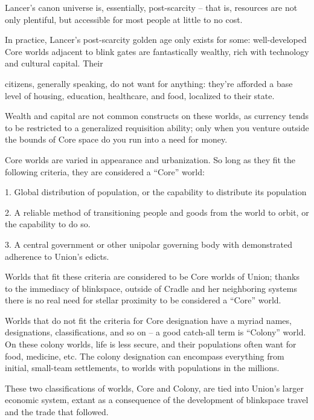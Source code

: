 Lancer’s canon universe is, essentially, post-scarcity -- that is, resources are not only plentiful,  
but accessible for most people at little to no cost. 
 

In practice, Lancer’s post-scarcity golden age only exists for some: well-developed Core worlds  
adjacent to blink gates are fantastically wealthy, rich with technology and cultural capital. Their  

                                                                                                           


citizens, generally speaking, do not want for anything: they’re afforded a base level of housing,  
education, healthcare, and food, localized to their state. 
 

Wealth and capital are not common constructs on these worlds, as currency tends to be  
restricted to a generalized requisition ability; only when you venture outside the bounds of Core  
space do you run into a need for money. 
 

Core worlds are varied in appearance and urbanization. So long as they fit the following criteria,  
they are considered a “Core” world: 
 

     1.  Global distribution of population, or the capability to distribute its population
 
    2.   A reliable method of transitioning people and goods from the world to orbit, or the  
         capability to do so. 
 
     3.  A central government or other unipolar governing body with demonstrated adherence to  
         Union’s edicts. 
 

Worlds that fit these criteria are considered to be Core worlds of Union; thanks to the immediacy  
of blinkspace, outside of Cradle and her neighboring systems there is no real need for stellar  
proximity to be considered a “Core” world. 
 

Worlds that do not fit the criteria for Core designation have a myriad names, designations,  
classifications, and so on -- a good catch-all term is “Colony” world. On these colony worlds, life  
is less secure, and their populations often want for food, medicine, etc. The colony designation  
can encompass everything from initial, small-team settlements, to worlds with populations in the  
millions.  
 

These two classifications of worlds, Core and Colony, are tied into Union’s larger economic  
system, extant as a consequence of the development of blinkspace travel and the trade that  
followed.  
 

